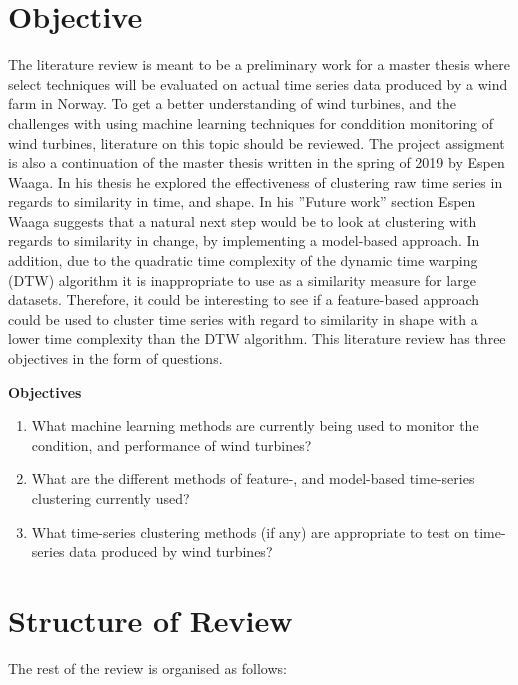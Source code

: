 \section{Objective} \label{sec:objective}

The literature review is meant to be a preliminary work for a master thesis where select techniques will be evaluated on actual time series data produced by a wind farm in Norway. 
To get a better understanding of wind turbines, and the challenges with using machine learning techniques for conddition monitoring of wind turbines, literature on this topic should be reviewed.  
The project assigment is also a continuation of the master thesis written in the spring of 2019 by Espen Waaga. 
In his thesis he explored the effectiveness of clustering raw time series in regards to similarity in time, and shape. 
In his ''Future work'' section Espen Waaga suggests that a natural next step would be to look at clustering with regards to similarity in change, by implementing a model-based approach. 
In addition, due to the quadratic time complexity of the dynamic time warping (DTW) algorithm it is inappropriate to use as a similarity measure for large datasets. 
Therefore, it could be interesting to see if a feature-based approach could be used to cluster time series with regard to similarity in shape with a lower time complexity than the DTW algorithm. 
This literature review has three objectives in the form of questions. \bigskip

\begin{tcolorbox}
    \textbf{Objectives}

    \begin{enumerate}
        \item What machine learning methods are currently being used to monitor the condition, and performance of wind turbines?
        \item What are the different methods of feature-, and model-based time-series clustering currently used?
        \item What time-series clustering methods (if any) are appropriate to test on time-series data produced by wind turbines? 
    \end{enumerate}
\end{tcolorbox}

\section{Structure of Review}
The rest of the review is organised as follows:

